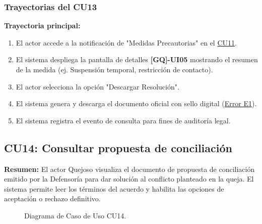 \begin{appendices}
\subsubsection{Trayectorias del CU13}
\textbf{Trayectoria principal:}
\begin{enumerate}[nosep]
    \item El actor accede a la notificación de "Medidas Precautorias" en el \hyperlink{anexo:casos_uso}{CU11}.
    \item El sistema despliega la pantalla de detalles \textbf{[GQ]-UI05} mostrando el resumen de la medida (ej. Suspensión temporal, restricción de contacto).
    \item El actor selecciona la opción "Descargar Resolución".
    \item El sistema genera y descarga el documento oficial con sello digital (\hyperlink{err:E18}{Error E1}).
    \item El sistema registra el evento de consulta para fines de auditoría legal.
\end{enumerate}

\newpage

\subsection{CU14: Consultar propuesta de conciliación}

\textbf{Resumen:} 
El actor Quejoso visualiza el documento de propuesta de conciliación emitido por la Defensoría para dar solución al conflicto planteado en la queja. El sistema permite leer los términos del acuerdo y habilita las opciones de aceptación o rechazo definitivo.

\begin{figure}[htbp]
    \centering
    \figCUcatorce
    \caption{Diagrama de Caso de Uso CU14.}
    \label{fig:cu14}
\end{figure}


\end{appendices}
